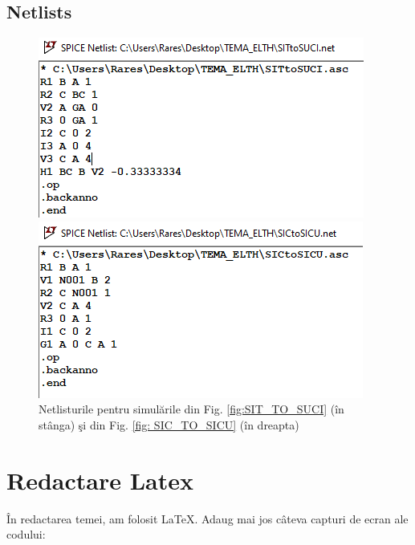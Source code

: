 \documentclass[multi=false, tikz, border=2mm]{article}
\newcommand\tab[1][0.6cm]{\hspace*{#1}}
\begin{document}
	\pagebreak

	\subsection{Netlists}
	
	\begin{figure}[H]
	\begin{minipage}{0.5\textwidth}
	\includegraphics[scale=0.7]{NETLIST_SIT_TO_SUCI}
	\end{minipage}	
	\begin{minipage}{0.5\textwidth}
	\includegraphics[scale=0.7]{NETLIST_SIC_TO_SICU}	
	\end{minipage}
	\caption{Netlisturile pentru simul\u{a}rile din Fig. \ref{fig:SIT_TO_SUCI} (\^{i}n st\^{a}nga) \c{s}i din Fig. \ref{fig: SIC_TO_SICU} (\^{i}n dreapta)}\label{fig: NETLISTS}
	\end{figure}
\pagebreak
\section{Redactare Latex}
\tab \^{I}n redactarea temei, am folosit \LaTeX. Adaug mai jos c\^{a}teva capturi de ecran ale codului:
	\vspace{0.5cm}
\end{document}
